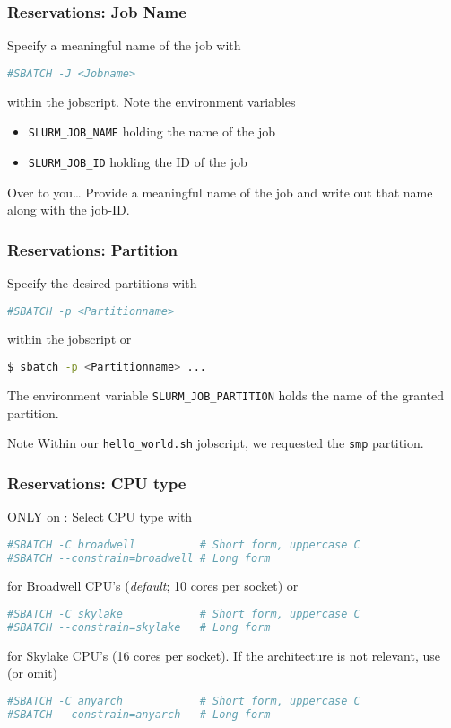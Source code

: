 \begin{frame}[fragile]%
  \frametitle{Reservations: Job Name}
Specify a meaningful name of the job with
\begin{lstlisting}[language=Bash,style=Shell]
#SBATCH -J <Jobname>
\end{lstlisting}
within the jobscript. Note the environment variables
\begin{itemize}
\item \verb+SLURM_JOB_NAME+ holding the name of the job
\item \verb+SLURM_JOB_ID+ holding the ID of the job
\end{itemize}
\begin{block}{Over to you\ldots}
Provide a meaningful name of the job and write out that name along with the job-ID.
\end{block}
  \vfill
\end{frame}

\begin{frame}[fragile]%
  \frametitle{Reservations: Partition}
  Specify the desired partitions with 
\begin{lstlisting}[language=Bash,style=Shell]
#SBATCH -p <Partitionname>
\end{lstlisting}
within the jobscript or
\begin{lstlisting}[language=Bash,style=Shell]
$ sbatch -p <Partitionname> ...
\end{lstlisting}
The environment variable \verb+SLURM_JOB_PARTITION+ holds the name of the granted partition.

\begin{block}{Note}
  Within our \verb+hello_world.sh+ jobscript, we requested the \verb+smp+ partition.
\end{block}
  \vfill
\end{frame}

\begin{frame}[fragile]
  \frametitle{Reservations: CPU type}
  {\bcoeil \color{UniRot}ONLY on \mogonII:}\newline
    Select CPU type with
  \begin{lstlisting}[language=Bash,style=Shell]
#SBATCH -C broadwell          # Short form, uppercase C
#SBATCH --constrain=broadwell # Long form
\end{lstlisting}
for Broadwell CPU's (\emph{default}; 10 cores per socket) or
\begin{lstlisting}[language=Bash,style=Shell]
#SBATCH -C skylake            # Short form, uppercase C
#SBATCH --constrain=skylake   # Long form
\end{lstlisting}
for Skylake CPU's (16 cores per socket). If the architecture is not relevant, use (or omit)
\begin{lstlisting}[language=Bash,style=Shell]
#SBATCH -C anyarch            # Short form, uppercase C
#SBATCH --constrain=anyarch   # Long form
\end{lstlisting}
\vfill
\end{frame}

